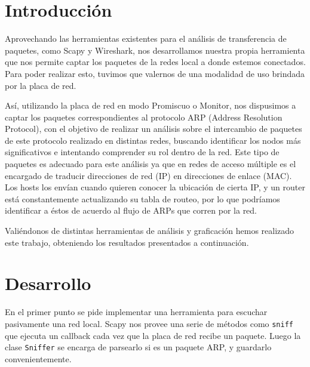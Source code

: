 \documentclass[a4paper, 11pt]{article}
\begin{document}
\pagestyle{myheadings}
\maketitle

\thispagestyle{empty}
\tableofcontents

\newpage

\section{Introducción}

Aprovechando las herramientas existentes para el an\'alisis de transferencia de paquetes, como Scapy y Wireshark, nos desarrollamos nuestra propia herramienta que nos permite captar los paquetes de la redes local a donde estemos conectados. Para poder realizar esto, tuvimos que valernos de una modalidad de uso brindada por la placa de red.

As\'i, utilizando la placa de red en modo Promiscuo o Monitor, nos dispusimos a captar los paquetes correspondientes al protocolo ARP (Address Resolution Protocol), con el objetivo de realizar un an\'alisis sobre el intercambio de paquetes de este protocolo realizado en distintas redes, buscando identificar los nodos m\'as significativos e intentando comprender su rol dentro de la red. Este tipo de paquetes es adecuado para este an\'alisis ya que en redes de acceso m\'ultiple es el encargado de traducir direcciones de red (IP) en direcciones de enlace (MAC). Los hosts los env\'ian cuando quieren conocer la ubicaci\'on de cierta IP, y un router est\'a constantemente actualizando su tabla de routeo, por lo que podr\'iamos identificar a \'estos de acuerdo al flujo de ARPs que corren por la red. 

Vali\'endonos de distintas herramientas de an\'alisis y graficaci\'on hemos realizado este trabajo, obteniendo los resultados presentados a continuaci\'on.

\section{Desarrollo}

En el primer punto se pide implementar una herramienta para escuchar pasivamente una red local. Scapy nos provee una serie de m\'etodos como \texttt{sniff} que ejecuta un callback cada vez que la placa de red recibe un paquete. Luego la clase \texttt{Sniffer} se encarga de parsearlo si es un paquete ARP, y guardarlo convenientemente.  
\end{document}

